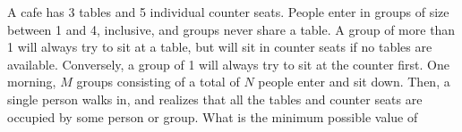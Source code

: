 A cafe has 3 tables and 5 individual counter seats. People enter in groups of size between 1 and 4, inclusive, and groups never share a table. A group of more than 1 will always try to sit at a table, but will sit in counter seats if no tables are available. Conversely, a group of 1 will always try to sit at the counter ﬁrst. One morning, $M$ groups consisting of a total of $N$ people enter and sit down. Then, a single person walks in, and realizes that all the tables and counter seats are occupied by some person or group. What is the minimum possible value of 